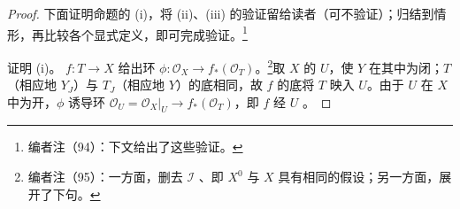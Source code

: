\begin{proof}
下面证明命题的 (i)，将 (ii)、(iii) 的验证留给读者（可不验证）；归结到情形，再比较各个显式定义，即可完成验证。\footnote{编者注（94）：下文给出了这些验证。}

证明 (i)。 $f:T\to X$ 给出环 $\phi:\mathscr O_X\to f_*(\mathscr O_T)$。\footnote{编者注（95）：一方面，删去 $\mathscr I$ 、即 $X^0$ 与 $X$ 具有相同的假设；另一方面，展开了下句。}取 $X$ 的 $U$，使 $Y$ 在其中为闭；$T$（相应地 $Y_J$）与 $T_J$（相应地 $Y$）的底相同，故 $f$ 的底将 $T$ 映入 $U$。由于 $U$ 在 $X$ 中为开，$\phi$ 诱导环 $\mathscr O_U=\mathscr O_X|_U\to f_*(\mathscr O_T)$，即 $f$ 经 $U$ 。


\end{proof}
